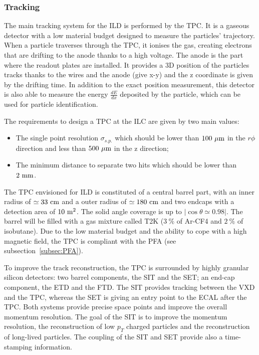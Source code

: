      \subsubsection{Tracking}

      The main tracking system for the \gls{ILD} is performed by the \gls{TPC}.
      It is a gaseous detector with a low material budget designed to measure the particles' trajectory.
      When a particle traverses through the \gls{TPC}, it ionises the gas, creating electrons that are drifting to the anode thanks to a high voltage.
      The anode is the part where the readout plates are installed.
      It provides a 3D position of the particles tracks thanks to the wires and the anode (give x-y) and the z coordinate is given by the drifting time.
      In addition to the exact position measurement, this detector is also able to measure the energy $\frac{dE}{dx}$ deposited by the particle, which can be used for particle identification.

      The requirements to design a \gls{TPC} at the \gls{ILC} are given by two main values: 
      
      \begin{itemize} 
        \item The single point resolution $\sigma_{s.p.}$ which should be lower than $100~\rm{\mu m}$ in the $r\phi$ direction and less than $500~\rm{\mu m}$ in the z direction;
        \item The minimum distance to separate two hits which should be lower than $2~\rm{mm}$.
      \end{itemize}

      The \gls{TPC} envisioned for \gls{ILD} is constituted of a central barrel part, with an inner radius of $\simeq 33~\rm{cm}$ and a outer radius of $\simeq 180~\rm{cm}$ and two endcaps with a detection area of $10~\rm{m^2}$. 
      The solid angle coverage is up to $|\cos{\theta} \simeq 0.98|$.
      The barrel will be filled with a gas mixture called T2K ($3~\%$ of Ar-CF4 and $2~\%$ of isobutane).
      Due to the low material budget and the ability to cope with a high magnetic field, the \gls{TPC} is compliant with the \gls{PFA} (see subsection~\ref{subsec:PFA}). 


      To improve the track reconstruction, the \gls{TPC} is surrounded by highly granular silicon detectors: two barrel components, the \gls{SIT} and the \gls{SET}; an end-cap component, the \gls{ETD} and the \gls{FTD}.
      The \gls{SIT} provides tracking between the \gls{VXD} and the \gls{TPC}, whereas the \gls{SET} is giving an entry point to the \gls{ECAL} after the \gls{TPC}.
      Both systems provide precise space points and improve the overall momentum resolution.
      The goal of the \gls{SIT} is to improve the momentum resolution, the reconstruction of low $p_{T}$ charged particles and the reconstruction of long-lived particles.
      The coupling of the \gls{SIT} and \gls{SET} provide also a time-stamping information.

